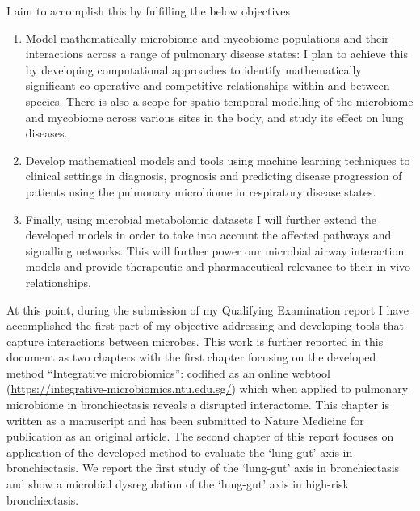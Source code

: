 I aim to accomplish this by fulfilling the below objectives 
\begin{enumerate}
	\item Model mathematically microbiome and mycobiome populations and their interactions across a range of pulmonary disease states: I plan to achieve this by developing computational approaches to identify mathematically significant co-operative and competitive relationships within and between species. There is also a scope for spatio-temporal modelling of the microbiome and mycobiome across various sites in the body, and study its effect on lung diseases.
	\item Develop mathematical models and tools using machine learning techniques to clinical settings in diagnosis, prognosis and predicting disease progression of patients using the pulmonary microbiome in respiratory disease states.
	\item Finally, using microbial metabolomic datasets I will further extend the developed models in order to take into account the affected pathways and signalling networks. This will further power our microbial airway interaction models and provide therapeutic and pharmaceutical relevance to their in vivo relationships. 
\end{enumerate}

At this point, during the submission of my Qualifying Examination report I have accomplished the first part of my objective addressing and developing tools that capture interactions between microbes. This work is further reported in this document as two chapters with the first chapter focusing on the developed method ``Integrative microbiomics'': codified as an online webtool (\url{https://integrative-microbiomics.ntu.edu.sg/})  which when applied to pulmonary microbiome in bronchiectasis reveals a disrupted interactome. This chapter is written as a manuscript and has been submitted to Nature Medicine for publication as an original article. The second chapter of this report focuses on application of the developed method to evaluate the `lung-gut' axis in bronchiectasis. We report the first study of the `lung-gut' axis in bronchiectasis and show a microbial dysregulation of the ‘lung-gut’ axis in high-risk bronchiectasis. 